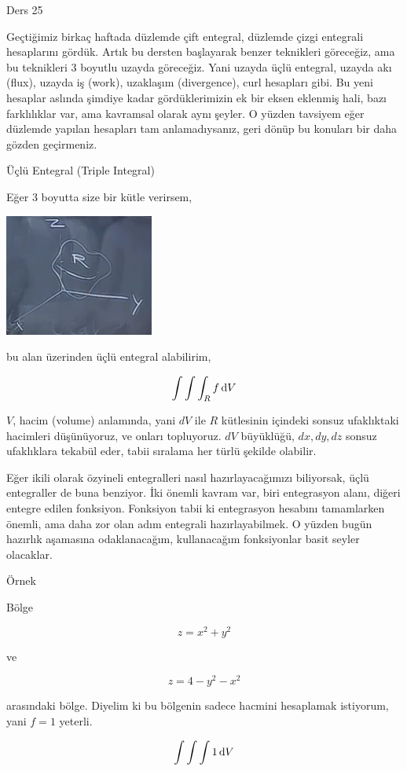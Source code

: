 \documentclass[12pt,fleqn]{article}\usepackage{../../common}
\begin{document}
Ders 25

Geçtiğimiz birkaç haftada düzlemde çift entegral, düzlemde çizgi entegrali
hesaplarını gördük. Artık bu dersten başlayarak benzer teknikleri göreceğiz, ama
bu teknikleri 3 boyutlu uzayda göreceğiz. Yani uzayda üçlü entegral, uzayda akı
(flux), uzayda iş (work), uzaklaşım (divergence), curl hesapları gibi. Bu yeni
hesaplar aslında şimdiye kadar gördüklerimizin ek bir eksen eklenmiş hali, bazı
farklılıklar var, ama kavramsal olarak aynı şeyler. O yüzden tavsiyem eğer
düzlemde yapılan hesapları tam anlamadıysanız, geri dönüp bu konuları bir daha
gözden geçirmeniz.

Üçlü Entegral (Triple Integral)

Eğer 3 boyutta size bir kütle verirsem, 

\includegraphics[height=4cm]{25_1.png}

bu alan üzerinden üçlü entegral alabilirim, 

$$ \int \int \int _R f \,\mathrm{d} V $$

$V$, hacim (volume) anlamında, yani $dV$ ile $R$ kütlesinin içindeki sonsuz
ufaklıktaki hacimleri düşünüyoruz, ve onları topluyoruz. $dV$ büyüklüğü,
$dx,dy,dz$ sonsuz ufaklıklara tekabül eder, tabii sıralama her türlü
şekilde olabilir.

Eğer ikili olarak özyineli entegralleri nasıl hazırlayacağımızı biliyorsak,
üçlü entegraller de buna benziyor. İki önemli kavram var, biri entegrasyon
alanı, diğeri entegre edilen fonksiyon. Fonksiyon tabii ki entegrasyon
hesabını tamamlarken önemli, ama daha zor olan adım entegrali
hazırlayabilmek. O yüzden bugün hazırlık aşamasına odaklanacağım,
kullanacağım fonksiyonlar basit seyler olacaklar.

Örnek 

Bölge 

$$z = x^2 + y^2$$

ve 

$$z = 4 - y^2 - x^2$$

arasındaki bölge. Diyelim ki bu bölgenin sadece hacmini hesaplamak
istiyorum, yani $f = 1$ yeterli.

$$ \int \int \int 1 \,\mathrm{d} V $$
\end{document}
